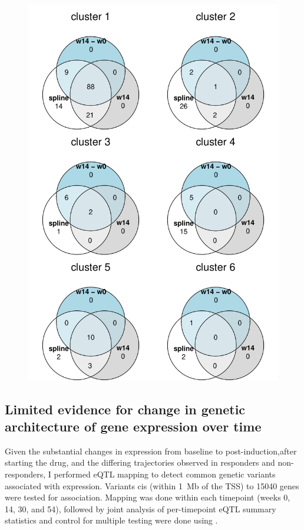 \begin{outline}
\begin{figure}
    \centering
    \includegraphics[width=1.0\textwidth,page=1]{mainmatter/figures/chapter_04/plot_gene_set_enrichment.spline_cluster_venns.pdf}
    \caption{}
    \label{fig:plot_gene_set_enrichment.spline_cluster_venns.pdf}
\end{figure}
    
\subsection{Limited evidence for change in genetic architecture of gene expression over time}

Given the substantial changes in expression from baseline to post-induction,after starting the drug, and the differing trajectories observed in responders and non-responders, 
I performed \gls{eQTL} mapping to detect common genetic variants associated with expression.
Variants cis (within \SI{1}{\mega b} of the TSS) to 15040 genes were tested for association.
Mapping was done within each timepoint (weeks 0, 14, 30, and 54),
followed by joint analysis of per-timepoint \gls{eQTL} summary statistics and control for multiple testing were done using .


\end{outline}
